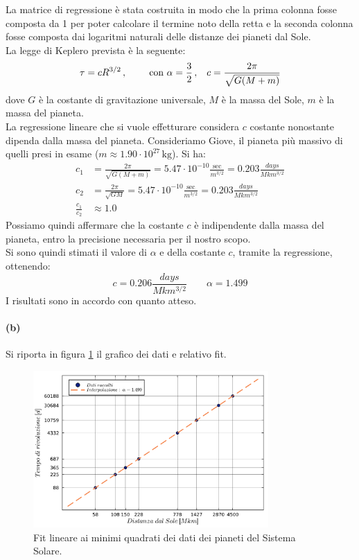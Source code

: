 \documentclass[letterpaper, 12pt]{article}
\numberwithin{equation}{section}    %
\begin{document}
La matrice di regressione è stata costruita in modo che la prima colonna fosse composta da 1 per poter calcolare
il termine noto della retta e la seconda colonna fosse composta dai logaritmi naturali delle
distanze dei pianeti dal Sole. \\
La legge di Keplero prevista è la seguente:
\begin{equation}
    \label{eq:keplero}
    \tau = c R^{3/2}\,, \qquad \text{ con } \alpha = \frac{3}{2}\,, \hspace{0.3cm} c = \frac{2\pi}{\sqrt{G (M+m)}}
\end{equation}
dove $G$ è la costante di gravitazione universale, $M$ è la massa del Sole, $m$ è la massa del pianeta. \\
La regressione lineare che si vuole effetturare considera $c$ costante nonostante dipenda dalla massa del pianeta.
Consideriamo Giove, il pianeta più massivo di quelli presi in esame ($m \approx 1.90 \cdot 10^{27} \, \text{kg}$). Si ha:
\begin{align*}
    c_1 &= \frac{2\pi}{\sqrt{G (M+m)}} = 5.47 \cdot 10^{-10} \frac{\text{sec}}{m^{3/2}} = 0.203 \frac{days}{Mkm^{3/2}}  \\
    c_2 &= \frac{2\pi}{\sqrt{G M}}   = 5.47 \cdot 10^{-10} \frac{\text{sec}}{m^{3/2}} = 0.203 \frac{days}{Mkm^{3/2}}    \\
    \frac{c_1}{c_2} &\approx 1.0
\end{align*}
Possiamo quindi affermare che la costante $c$ è indipendente dalla massa del pianeta, entro la precisione 
necessaria per il nostro scopo. \\
Si sono quindi stimati il valore di $\alpha$ e della costante $c$, tramite la regressione, ottenendo:
\begin{equation*}
    c = 0.206 \frac{days}{Mkm^{3/2}}
    \qquad
    \alpha = 1.499
\end{equation*}
I risultati sono in accordo con quanto atteso.

\paragraph{(b)}Si riporta in figura \ref{fig:es2_6_2_1} il grafico dei dati e relativo fit.

\begin{figure}[!ht]
    \centering
    \includegraphics[width=0.8\textwidth]{2621.pdf}
    \caption{Fit lineare ai minimi quadrati dei dati dei pianeti del Sistema Solare.}
    \label{fig:es2_6_2_1}
\end{figure}
\end{document}
